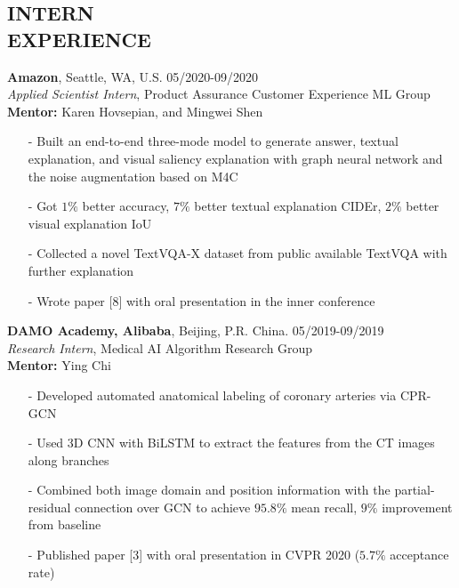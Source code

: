 \documentclass[margin]{res}
\begin{document}
\begin{resume}
\section{INTERN \\ EXPERIENCE}
                \textbf{Amazon}, Seattle, WA, U.S. \hfill 05/2020-09/2020\\
                {\it Applied Scientist Intern}, Product Assurance Customer Experience ML Group\\
                \textbf{Mentor:} Karen Hovsepian, and Mingwei Shen
                \begin{itemize}\itemsep -2.2pt %
                \item[-] Built an end-to-end three-mode model to generate answer, textual explanation, and visual saliency explanation with graph neural network and the noise augmentation based on M4C
                \item[-] Got $1\%$ better accuracy, $7\%$ better textual explanation CIDEr, $2\%$ better visual explanation IoU
                 \item[-] Collected a novel TextVQA-X dataset from public available TextVQA with further explanation
                 \item[-] Wrote paper [8] with oral presentation in the inner conference
                 \end{itemize}
                
                \vspace{-1em}  
                
                \textbf{DAMO Academy, Alibaba}, Beijing, P.R. China. \hfill 05/2019-09/2019\\
                {\it Research Intern}, Medical AI Algorithm Research Group\\
                \textbf{Mentor:} Ying Chi
                \begin{itemize}\itemsep -2.2pt %
                 \item[-] Developed automated anatomical labeling of coronary arteries via CPR-GCN
                 \item[-] Used 3D CNN with BiLSTM to extract the features from the CT images along branches
                 \item[-] Combined both image domain and position information with the partial-residual connection over GCN to achieve $95.8\%$ mean recall, $9\%$ improvement from baseline
                 \item[-] Published paper [3] with oral presentation in CVPR 2020 ($5.7\%$ acceptance rate)
                 \end{itemize}


\end{resume}
\end{document}
